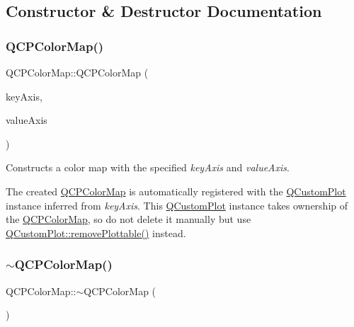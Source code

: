 \subsection{Constructor \& Destructor Documentation}
\mbox{\label{class_q_c_p_color_map_aa37e976d2ee1e2be6c4cd88a64b36215}} 
\subsubsection{\texorpdfstring{Q\+C\+P\+Color\+Map()}{QCPColorMap()}}
{\footnotesize\ttfamily Q\+C\+P\+Color\+Map\+::\+Q\+C\+P\+Color\+Map (\begin{DoxyParamCaption}\item[{\hyperlink{class_q_c_p_axis}{Q\+C\+P\+Axis} $\ast$}]{key\+Axis,  }\item[{\hyperlink{class_q_c_p_axis}{Q\+C\+P\+Axis} $\ast$}]{value\+Axis }\end{DoxyParamCaption})\hspace{0.3cm}{\ttfamily [explicit]}}

Constructs a color map with the specified {\itshape key\+Axis} and {\itshape value\+Axis}.

The created \hyperlink{class_q_c_p_color_map}{Q\+C\+P\+Color\+Map} is automatically registered with the \hyperlink{class_q_custom_plot}{Q\+Custom\+Plot} instance inferred from {\itshape key\+Axis}. This \hyperlink{class_q_custom_plot}{Q\+Custom\+Plot} instance takes ownership of the \hyperlink{class_q_c_p_color_map}{Q\+C\+P\+Color\+Map}, so do not delete it manually but use \hyperlink{class_q_custom_plot_af3dafd56884208474f311d6226513ab2}{Q\+Custom\+Plot\+::remove\+Plottable()} instead. \mbox{\label{class_q_c_p_color_map_ac8a952a40fed62dcee33405b0f4d47ad}} 
\subsubsection{\texorpdfstring{$\sim$\+Q\+C\+P\+Color\+Map()}{~QCPColorMap()}}
{\footnotesize\ttfamily Q\+C\+P\+Color\+Map\+::$\sim$\+Q\+C\+P\+Color\+Map (\begin{DoxyParamCaption}{ }\end{DoxyParamCaption})\hspace{0.3cm}{\ttfamily [virtual]}}



